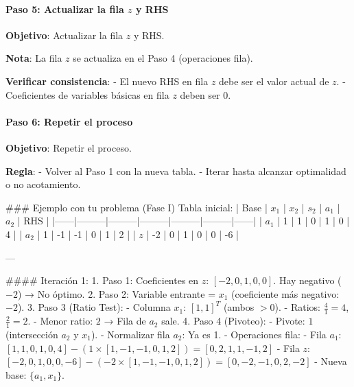 \paragraph{Paso 5: Actualizar la fila \(z\) y RHS}

\begin{tcolorbox}[title=Resumen del paso 5]
  \noindent \textbf{Objetivo}: Actualizar la fila \(z\) y RHS.
  
  \noindent \textbf{Nota}: La fila \(z\) se actualiza en el Paso 4 (operaciones fila).
  
  \noindent \textbf{Verificar consistencia}:
  - El nuevo RHS en fila \(z\) debe ser el valor actual de \(z\).
  - Coeficientes de variables básicas en fila \(z\) deben ser 0.
\end{tcolorbox}

\paragraph{Paso 6: Repetir el proceso}

\begin{tcolorbox}[title=Resumen del paso 6]
  \noindent \textbf{Objetivo}: Repetir el proceso.
  
  \noindent \textbf{Regla}:
  - Volver al Paso 1 con la nueva tabla.
  - Iterar hasta alcanzar optimalidad o no acotamiento.
\end{tcolorbox}

### Ejemplo con tu problema (Fase I)
Tabla inicial:
| Base | \(x_1\) | \(x_2\) | \(s_2\) | \(a_1\) | \(a_2\) | RHS  |
|------|---------|---------|---------|---------|---------|------|
| \(a_1\) | 1       | 1       | 0       | 1       | 0       | 4    |
| \(a_2\) | 1       | -1      | -1      | 0       | 1       | 2    |
| \(z\)  | -2      | 0       | 1       | 0       | 0       | -6   |

---

#### Iteración 1:
1. Paso 1: Coeficientes en \(z\): \([-2, 0, 1, 0, 0]\). Hay negativo (\(-2\)) → No óptimo.
2. Paso 2: Variable entrante = \(x_1\) (coeficiente más negativo: \(-2\)).
3. Paso 3 (Ratio Test):
   - Columna \(x_1\): \([1, 1]^T\) (ambos \(> 0\)).
   - Ratios: \(\frac{4}{1} = 4\), \(\frac{2}{1} = 2\).
   - Menor ratio: \(2\) → Fila de \(a_2\) sale.
4. Paso 4 (Pivoteo):
   - Pivote: \(1\) (intersección \(a_2\) y \(x_1\)).
   - Normalizar fila \(a_2\): Ya es 1.
   - Operaciones fila:
     - Fila \(a_1\): \([1, 1, 0, 1, 0, 4] - (1 \times [1, -1, -1, 0, 1, 2]) = [0, 2, 1, 1, -1, 2]\)
     - Fila \(z\): \([-2, 0, 1, 0, 0, -6] - (-2 \times [1, -1, -1, 0, 1, 2]) = [0, -2, -1, 0, 2, -2]\)
   - Nueva base: \(\{a_1, x_1\}\).

